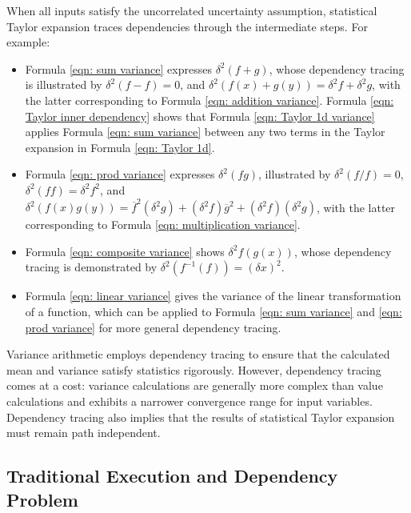 \documentclass[twoside]{article}
\numberwithin{equation}{section}
\begin{document}
When all inputs satisfy the uncorrelated uncertainty assumption, statistical Taylor expansion traces dependencies through the intermediate steps.
For example:
\begin{itemize}
\item Formula \eqref{eqn: sum variance} expresses $\delta^2 (f + g)$, whose dependency tracing is illustrated by $\delta^2 (f - f) = 0$, and $\delta^2 (f(x) + g(y)) = \delta^2 f + \delta^2 g$, with the latter corresponding to Formula \eqref{eqn: addition variance}.   
Formula \eqref{eqn: Taylor inner dependency} shows that Formula \eqref{eqn: Taylor 1d variance} applies Formula \eqref{eqn: sum variance} between any two terms in the Taylor expansion in Formula \eqref{eqn: Taylor 1d}.

\item Formula \eqref{eqn: prod variance} expresses $\delta^2 (f g)$, illustrated by $\delta^2 (f/f) = 0$, $\delta^2 (f f) = \delta^2 f^2$, and $\delta^2 (f(x) g(y)) = \overline{f}^2 (\delta^2 g) + (\delta^2 f) \overline{g}^2 +  (\delta^2 f) (\delta^2 g)$, with the latter corresponding to Formula \eqref{eqn: multiplication variance}.  

\item Formula \eqref{eqn: composite variance} shows  $\delta^2 f(g(x))$, whose dependency tracing is demonstrated by $\delta^2 (f^{-1}(f)) = (\delta x)^2$.  

\item Formula \eqref{eqn: linear variance} gives the variance of the linear transformation of a function, which can be applied to Formula \eqref{eqn: sum variance} and \eqref{eqn: prod variance} for more general dependency tracing.

\end{itemize}
Variance arithmetic employs dependency tracing to ensure that the calculated mean and variance satisfy statistics rigorously.
However, dependency tracing comes at a cost: variance calculations are generally more complex than value calculations and exhibits a narrower convergence range for input variables.
Dependency tracing also implies that the results of statistical Taylor expansion must remain path independent.


\subsection{Traditional Execution and Dependency Problem}

\iffalse
\end{document}
